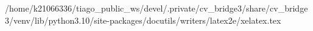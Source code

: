 /home/k21066336/tiago_public_ws/devel/.private/cv_bridge3/share/cv_bridge3/venv/lib/python3.10/site-packages/docutils/writers/latex2e/xelatex.tex